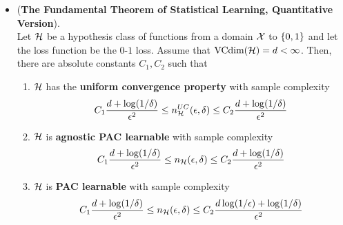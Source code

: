 \documentclass[11pt]{article}
\begin{document}
\begin{itemize}
\item \begin{theorem} (\textbf{The Fundamental Theorem of Statistical Learning, Quantitative Version}). \citep{shalev2014understanding}\\
Let ${\mathcal H}$ be a hypothesis class of functions from a domain ${\mathcal X}$ to $\left\{0,1\right\}$ and let the loss function be the $0$-$1$ loss. Assume that $\text{VCdim}({\mathcal H}) = d < \infty$. Then, there are absolute constants $C_1, C_2$ such that
\begin{enumerate}
\item ${\mathcal H}$ has the \textbf{uniform convergence property} with sample complexity
\begin{align*}
C_1\frac{d + \log(1/\delta)}{\epsilon^2} \le n^{UC}_{{\mathcal H}}(\epsilon, \delta) \le C_2\frac{d + \log(1/\delta)}{\epsilon^2}
\end{align*}
\item ${\mathcal H}$ is \textbf{agnostic PAC learnable} with sample complexity
\begin{align*}
C_1\frac{d + \log(1/\delta)}{\epsilon^2} \le n_{{\mathcal H}}(\epsilon, \delta) \le C_2\frac{d + \log(1/\delta)}{\epsilon^2}
\end{align*}
\item ${\mathcal H}$ is \textbf{PAC learnable} with sample complexity
\begin{align*}
C_1\frac{d + \log(1/\delta)}{\epsilon^2} \le n_{{\mathcal H}}(\epsilon, \delta) \le C_2\frac{d\log(1/\epsilon) + \log(1/\delta)}{\epsilon^2}
\end{align*}
\end{enumerate}
\end{theorem}
\end{itemize}
\end{document}
